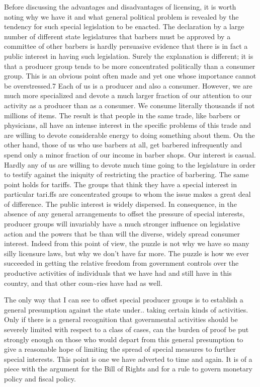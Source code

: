 \documentclass[11pt,openany]{book}
\begin{document}
Before discussing the advantages and disadvantages of licensing, it is worth noting why we have it and what general political problem is revealed by the tendency for such special legislation to be enacted. The declaration by a large number of different state legislatures that barbers must be approved by a committee of other barbers is hardly persuasive evidence that there is in fact a public interest in having such legislation. Surely the explanation is different; it is that a producer group tends to be more concentrated politically than a consumer group. This is an obvious point often made and yet one whose importance cannot be overstressed.7 Each of us is a producer and also a consumer. However, we are much more specialized and devote a much larger fraction of our attention to our activity as a producer than as a consumer. We consume literally thousands if not millions of items. The result is that people in the same trade, like barbers or physicians, all have an intense interest in the specific problems of this trade and are willing to devote considerable energy to doing something about them. On the other hand, those of us who use barbers at all, get barbered infrequently and spend only a minor fraction of our income in barber shops. Our interest is casual. Hardly any of us are willing to devote much time going to the legislature in order to testify against the iniquity of restricting the practice of barbering. The same point holds for tariffs. The groups that think they have a special interest in particular tari.ffs are concentrated groups to whom the issue makes a great deal of difference. The public interest is widely dispersed. In consequence, in the absence of any general arrangements to offset the pressure of special interests, producer groups will invariably have a much stronger influence on legislative action and the powers that be than will the diverse, widely spread consumer interest. Indeed from this point of view, the puzzle is not why we have so many silly licensure laws, but why we don't have far more. The puzzle is how we ever succeeded in getting the relative freedom from government controls over the productive activities of individuals that we have had and still have in this country, and that other coun\textasciitilde{}ries have had as well.

The only way that I can see to offset special producer groups is to establish a general presumption against the state under.. taking certain kinds of activities. Only if there is a general recognition that governmental activities should be severely limited with respect to a class of cases, can the burden of proof be put strongly enough on those who would depart from this general presumption to give a reasonable hope of limiting the spread of special measures to further special interests. This point is one we have adverted to time and again. It is of a piece with the argument for the Bill of Rights and for a rule to govern monetary policy and fiscal policy.
\end{document}
